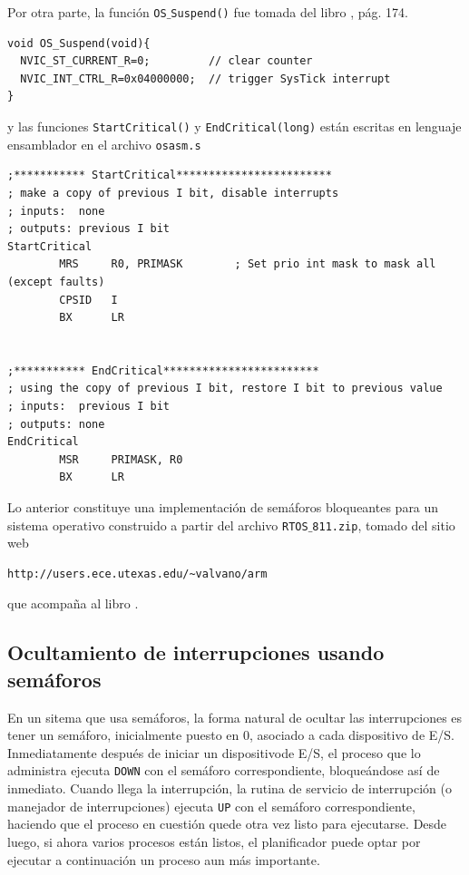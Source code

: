 \documentclass{article}
\begin{document}
Por otra parte, la funci\'on {\tt OS}$\_${\tt Suspend()} fue tomada 
del libro \cite{Valvano}, p\'ag. 174.
\begin{verbatim}
void OS_Suspend(void){
  NVIC_ST_CURRENT_R=0;         // clear counter
  NVIC_INT_CTRL_R=0x04000000;  // trigger SysTick interrupt
}
\end{verbatim}
y las funciones {\tt StartCritical()} y {\tt EndCritical(long)} est\'an 
escritas en lenguaje ensamblador en el archivo {\tt osasm.s}
\begin{verbatim}
;*********** StartCritical************************
; make a copy of previous I bit, disable interrupts
; inputs:  none
; outputs: previous I bit
StartCritical
        MRS     R0, PRIMASK        ; Set prio int mask to mask all (except faults)
        CPSID   I
        BX      LR


;*********** EndCritical************************
; using the copy of previous I bit, restore I bit to previous value
; inputs:  previous I bit
; outputs: none
EndCritical
        MSR     PRIMASK, R0
        BX      LR
\end{verbatim}
Lo anterior constituye una implementaci\'on de sem\'aforos bloqueantes para un  
sistema operativo construido a partir del archivo {\tt RTOS$\_$811.zip}, tomado del 
sitio web 
\begin{verbatim}
http://users.ece.utexas.edu/~valvano/arm
\end{verbatim}
que acompa\~na al libro \cite{Valvano}.

\subsection{Ocultamiento de interrupciones usando sem\'aforos\label{OcultarInterrupciones}}
En un sitema que usa sem\'aforos, la forma natural de ocultar las interrupciones 
es tener un sem\'aforo, inicialmente puesto en 0, asociado a cada dispositivo de 
E/S. Inmediatamente despu\'es de iniciar un dispositivode E/S, el proceso que lo 
administra ejecuta {\tt DOWN} con el sem\'aforo correspondiente, bloque\'andose 
as\'i de inmediato. Cuando llega la interrupci\'on, la rutina de servicio de 
interrupci\'on (o manejador de interrupciones) ejecuta {\tt UP} con el sem\'aforo 
correspondiente, haciendo que el proceso en cuesti\'on quede otra vez listo para 
ejecutarse. Desde luego, si ahora varios procesos est\'an listos, el planificador 
puede optar por ejecutar a continuaci\'on un proceso aun m\'as importante.
\end{document}
